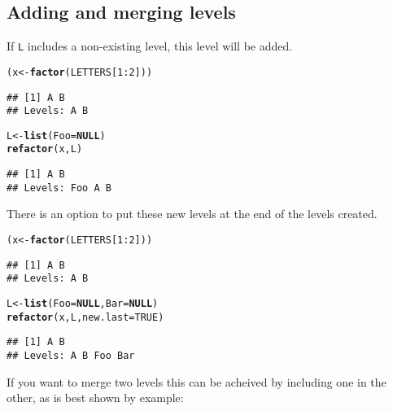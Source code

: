 \documentclass{article}\usepackage[]{graphicx}\usepackage[]{color}
\makeatletter
\newcommand{\hlnum}[1]{\textcolor[rgb]{0.686,0.059,0.569}{#1}}%
\newcommand{\hlopt}[1]{\textcolor[rgb]{0,0,0}{#1}}%
\newcommand{\hlstd}[1]{\textcolor[rgb]{0.345,0.345,0.345}{#1}}%
\newcommand{\hlkwa}[1]{\textcolor[rgb]{0.161,0.373,0.58}{\textbf{#1}}}%
\newcommand{\hlkwb}[1]{\textcolor[rgb]{0.69,0.353,0.396}{#1}}%
\newcommand{\hlkwc}[1]{\textcolor[rgb]{0.333,0.667,0.333}{#1}}%
\newcommand{\hlkwd}[1]{\textcolor[rgb]{0.737,0.353,0.396}{\textbf{#1}}}%
\newenvironment{kframe}{%
 \def\at@end@of@kframe{}%
 \ifinner\ifhmode%
  \def\at@end@of@kframe{\end{minipage}}%
  \begin{minipage}{\columnwidth}%
 \fi\fi%
 \def\FrameCommand##1{\hskip\@totalleftmargin \hskip-\fboxsep
 \colorbox{shadecolor}{##1}\hskip-\fboxsep
     \hskip-\linewidth \hskip-\@totalleftmargin \hskip\columnwidth}%
 \MakeFramed {\advance\hsize-\width
   \@totalleftmargin\z@ \linewidth\hsize
   \@setminipage}}%
 {\par\unskip\endMakeFramed%
 \at@end@of@kframe}
\newenvironment{knitrout}{}{} %
\newcommand{\code}{\texttt}
\makeatother
\begin{document}
\subsection{Adding and merging levels}
If \code{L} includes a non-existing level, this level will be added.
\begin{knitrout}
\color{fgcolor}\begin{kframe}
\begin{alltt}
\hlstd{(x} \hlkwb{<-} \hlkwd{factor}\hlstd{(LETTERS[}\hlnum{1}\hlopt{:}\hlnum{2}\hlstd{]))}
\end{alltt}
\begin{verbatim}
## [1] A B
## Levels: A B
\end{verbatim}
\begin{alltt}
\hlstd{L} \hlkwb{<-} \hlkwd{list}\hlstd{(}\hlkwc{Foo}\hlstd{=}\hlkwa{NULL}\hlstd{)}
\hlkwd{refactor}\hlstd{(x,L)}
\end{alltt}
\begin{verbatim}
## [1] A B
## Levels: Foo A B
\end{verbatim}
\end{kframe}
\end{knitrout}
There is an option to put these new levels at the end of the levels created.
\begin{knitrout}
\color{fgcolor}\begin{kframe}
\begin{alltt}
\hlstd{(x} \hlkwb{<-} \hlkwd{factor}\hlstd{(LETTERS[}\hlnum{1}\hlopt{:}\hlnum{2}\hlstd{]))}
\end{alltt}
\begin{verbatim}
## [1] A B
## Levels: A B
\end{verbatim}
\begin{alltt}
\hlstd{L} \hlkwb{<-} \hlkwd{list}\hlstd{(}\hlkwc{Foo}\hlstd{=}\hlkwa{NULL}\hlstd{,} \hlkwc{Bar}\hlstd{=}\hlkwa{NULL}\hlstd{)}
\hlkwd{refactor}\hlstd{(x,L,} \hlkwc{new.last}\hlstd{=}\hlnum{TRUE}\hlstd{)}
\end{alltt}
\begin{verbatim}
## [1] A B
## Levels: A B Foo Bar
\end{verbatim}
\end{kframe}
\end{knitrout}
If you want to merge two levels this can be acheived by including one in the other, as is best shown by example:
\end{document}
